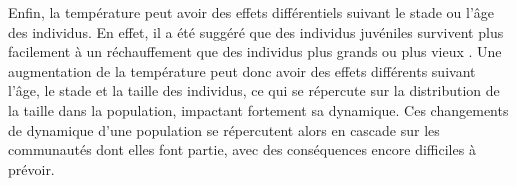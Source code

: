 Enfin, la température peut avoir des effets différentiels suivant le stade ou
l'âge des individus. En effet, il a été suggéré que des individus juvéniles
survivent plus facilement à un réchauffement que des individus plus grands ou
plus vieux \autocites{peck2009a}. Une augmentation de la température peut donc
avoir des effets différents suivant l'âge, le stade et la taille des individus,
ce qui se répercute sur la distribution de la taille dans la population, impactant
fortement sa dynamique. Ces changements de dynamique d'une population se
répercutent alors en cascade sur les communautés dont elles font partie, avec
des conséquences encore difficiles à prévoir. 
